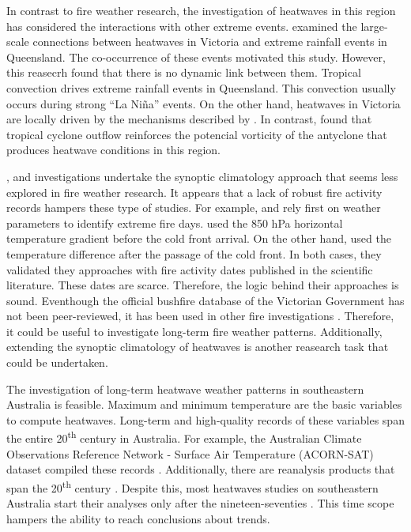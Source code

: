 In contrast to fire weather research, the investigation of heatwaves
in this region has considered the interactions with other extreme
events. \citet{Boschat2014} examined the large-scale connections
between heatwaves in Victoria and extreme rainfall events in Queensland.
The co-occurrence of these events motivated this study. However, this
reasecrh found that there is no dynamic link between them. Tropical
convection drives extreme rainfall events in Queensland. This convection
usually occurs during strong \textquotedblleft La Ni\~na\textquotedblright{}
events. On the other hand, heatwaves in Victoria are locally driven
by the mechanisms described by \citet{Pezza2012}. In contrast, \citet{Parker2014a}
found that tropical cyclone outflow reinforces the potencial vorticity
of the antyclone that produces heatwave conditions in this region. 

\citet{Pezza2012}, \citet{Boschat2014} and \citet{Parker2014a}
investigations undertake the synoptic climatology approach that seems
less explored in fire weather research. It appears that a lack of
robust fire activity records hampers these type of studies. For example,
\citet{Mills2005} and \citet{Reeder2015} rely first on weather parameters
to identify extreme fire days. \citet{Mills2005} used the 850 hPa
horizontal temperature gradient before the cold front arrival. On
the other hand, \citet{Reeder2015} used the temperature difference
after the passage of the cold front. In both cases, they validated
they approaches with fire activity dates published in the scientific
literature. These dates are scarce. Therefore, the logic behind their
approaches is sound. Eventhough the official bushfire database of
the Victorian Government has not been peer-reviewed, it has been used
in other fire investigations \citep{Harris2013}. Therefore, it could
be useful to investigate long-term fire weather patterns. Additionally,
extending the synoptic climatology of heatwaves is another reasearch
task that could be undertaken.

The investigation of long-term heatwave weather patterns in southeastern
Australia is feasible. Maximum and minimum temperature are the basic
variables to compute heatwaves. Long-term and high-quality records
of these variables span the entire 20\textsuperscript{th} century
in Australia. For example, the Australian Climate Observations Reference
Network - Surface Air Temperature (ACORN-SAT) dataset compiled these
records \citep{Trewin2013}. Additionally, there are reanalysis products
that span the 20\textsuperscript{th} century \citep{Compo2011,Stickler2014}.
Despite this, most heatwaves studies on southeastern Australia start
their analyses only after the nineteen-seventies \citep{Pezza2012,Parker2013,Boschat2014,Parker2014a}.
This time scope hampers the ability to reach conclusions about trends. 


